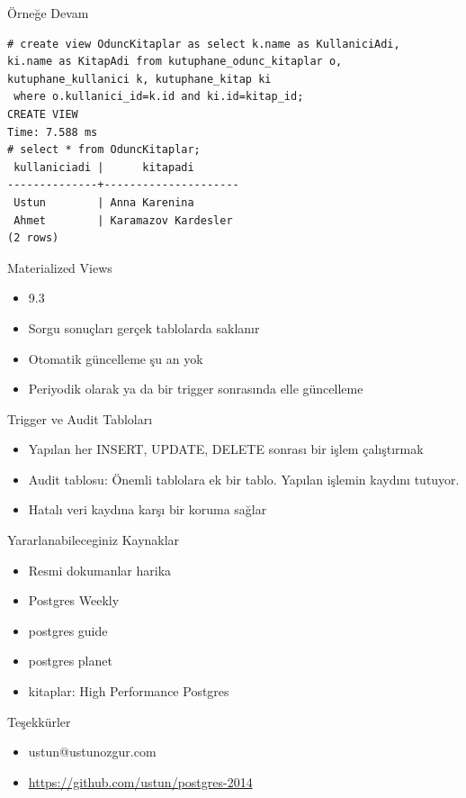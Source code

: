 \documentclass[presentation]{beamer}
\begin{document}
\begin{frame}[fragile,label=sec-36]{Örneğe Devam}
 \begin{verbatim}
# create view OduncKitaplar as select k.name as KullaniciAdi,
ki.name as KitapAdi from kutuphane_odunc_kitaplar o,
kutuphane_kullanici k, kutuphane_kitap ki
 where o.kullanici_id=k.id and ki.id=kitap_id;
CREATE VIEW
Time: 7.588 ms
# select * from OduncKitaplar;
 kullaniciadi |      kitapadi
--------------+---------------------
 Ustun        | Anna Karenina
 Ahmet        | Karamazov Kardesler
(2 rows)
\end{verbatim}
\end{frame}

\begin{frame}[label=sec-37]{Materialized Views}
\begin{itemize}
\item 9.3
\item Sorgu sonuçları gerçek tablolarda saklanır
\item Otomatik güncelleme şu an yok
\item Periyodik olarak ya da bir trigger sonrasında elle güncelleme
\end{itemize}
\end{frame}

\begin{frame}[label=sec-38]{Trigger ve Audit Tabloları}
\begin{itemize}
\item Yapılan her INSERT, UPDATE, DELETE sonrası bir işlem çalıştırmak
\item Audit tablosu: Önemli tablolara ek bir tablo. Yapılan işlemin kaydını
tutuyor.
\item Hatalı veri kaydına karşı bir koruma sağlar
\end{itemize}
\end{frame}

\begin{frame}[label=sec-39]{Yararlanabileceginiz Kaynaklar}
\begin{itemize}
\item Resmi dokumanlar harika
\item Postgres Weekly
\item postgres guide
\item postgres planet
\item kitaplar: High Performance Postgres
\end{itemize}
\end{frame}


\begin{frame}[label=sec-40]{Teşekkürler}
\begin{itemize}
\item ustun@ustunozgur.com
\item \url{https://github.com/ustun/postgres-2014}
\end{itemize}
\end{frame}
\end{document}
